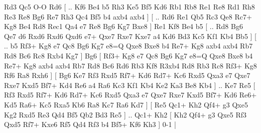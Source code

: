 \documentclass[a4paper,12pt,twoside]{article}
\begin{document}
\begin{multicols}{3}
 Rd3   Qc5    O-O   Rd6 [ .. Kf6  Be4 b5  Rh3 Ke5  Bf5 Kd6  Rb1 Rb8  Re1 Re8  Rd1 Rh8  Re3 Re8  Bg6 Re7  Rh3 Qc4  Bf5 b4  axb4 axb4   ]  [ .. Rd6  Re1 Qb5  Rc3 Qe8  Rc7+ Kg8  Be4 Rd8  Rec1 Qa4  e7 Re8  Bg6 Kg7  Bxe8   ]  Re1   Kf8    Be4   b5 [ .. Rd8  Bg6 Qe7  d6 Rxd6  Rxd6 Qxd6  e7+ Qxe7  Rxe7 Kxe7  a4 Kd6  Bd3 Kc5  Kf1 Kb4  Bb5   ]  [ .. b5  Rf3+ Kg8  e7 Qc8  Bg6 Kg7  e8=Q Qxe8  Bxe8 b4  Re7+ Kg8  axb4 axb4  Rb7 Rd8  Bc6 Rc8  Rxb4 Kg7   ]  Bg6 [  Rf3+ Kg8  e7 Qc8  Bg6 Kg7  e8=Q Qxe8  Bxe8 b4  Re7+ Kg8  axb4 axb4  Rb7 Rd8  Bc6 Rd6  Rb3 Kf8  R3xb4 Rd8  Rb3 Rc8  Rf3+ Kg8  Rf6 Ra8  Rxh6   ]  [  Bg6 Ke7  Rf3 Rxd5  Rf7+ Kd6  Rd7+ Kc6  Rxd5 Qxa3  e7 Qxe7  Rxe7 Kxd5  Bf7+ Kd4  Re6 a4  Ra6 Kc3  Kf1 Kb4  Ke2 Ka3  Be8 Kb4   ] .. Ke7    Re5 [  Rf3 Rxd5  Rf7+ Kd6  Rd7+ Kc6  Rxd5 Qxa3  e7 Qxe7  Rxe7 Kxd5  Bf7+ Kd6  Re6+ Kd5  Ra6+ Kc5  Rxa5 Kb6  Ra8 Kc7  Ra6 Kd7   ]  [  Re5 Qc1+  Kh2 Qf4+  g3 Qxe5  Kg2 Rxd5  Re3 Qd4  Bf5 Qb2  Bd3 Re5   ] .. Qc1+    Kh2    [  Kh2 Qf4+  g3 Qxe5  Rf3 Qxd5  Rf7+ Kxe6  Rf5 Qd4  Rf3 b4  Bf5+ Kf6  Kh3   ] 0-1  |


\end{multicols}
\end{document}
